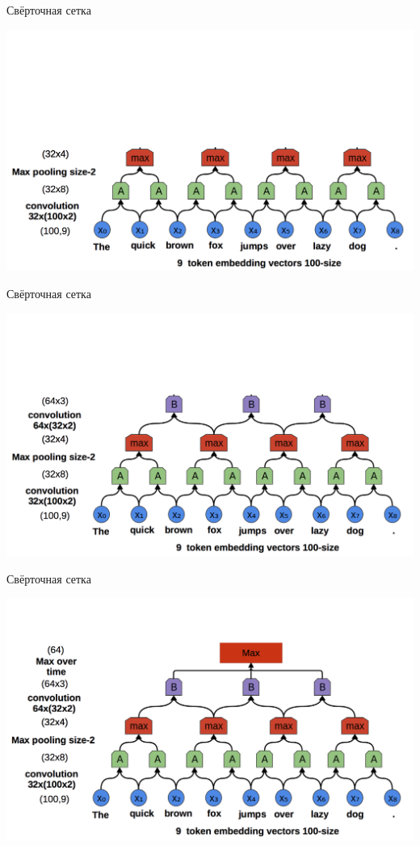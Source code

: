 \documentclass[notes,12pt, aspectratio=169]{beamer}
\begin{document}
\begin{frame}{Свёрточная сетка}
\begin{center}
	\includegraphics[width=.75\linewidth]{conv2.png}
\end{center}
\end{frame} 


\begin{frame}{Свёрточная сетка}
\begin{center}
	\includegraphics[width=.75\linewidth]{conv3.png}
\end{center}
\end{frame} 


\begin{frame}{Свёрточная сетка}
\begin{center}
	\includegraphics[width=.75\linewidth]{conv4.png}
\end{center}
\end{frame} 
\end{document}
